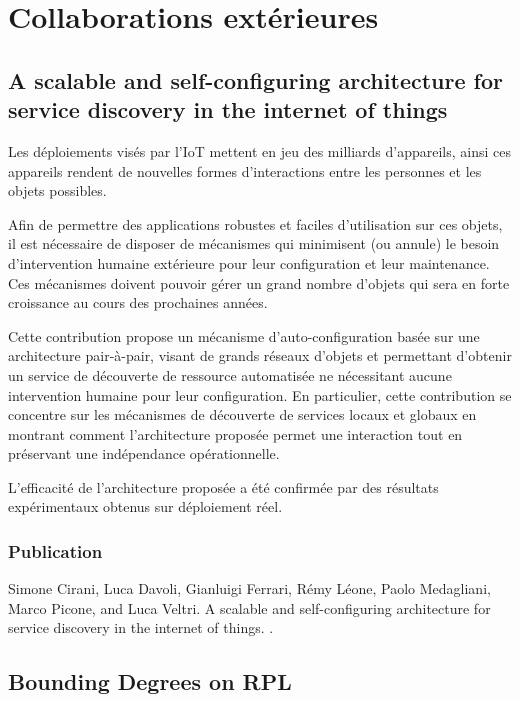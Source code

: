 \chapter{Collaborations extérieures}
\label{collaborations}

\section{A scalable and self-configuring architecture for service discovery in the internet of things}

Les déploiements visés par l'\ac{IoT} mettent en jeu des milliards d'appareils, ainsi ces appareils rendent de nouvelles formes d’interactions entre les personnes et les objets possibles.

Afin de permettre des applications robustes et faciles d'utilisation sur ces objets, il est nécessaire de disposer de mécanismes qui minimisent (ou annule) le besoin d'intervention humaine extérieure pour leur configuration et leur maintenance.
Ces mécanismes doivent pouvoir gérer un grand nombre d'objets qui sera en forte croissance au cours des prochaines années.

Cette contribution propose un mécanisme d'auto-configuration basée sur une architecture pair-à-pair, visant de grands réseaux d'objets et permettant d'obtenir un service de découverte de ressource automatisée ne nécessitant aucune intervention humaine pour leur configuration.
En particulier, cette contribution se concentre sur les mécanismes de découverte de services locaux et globaux en montrant comment l'architecture proposée permet une interaction tout en préservant une indépendance opérationnelle.

L'efficacité de l'architecture proposée a été confirmée par des résultats expérimentaux obtenus sur déploiement réel.

\subsection*{Publication}

Simone Cirani, Luca Davoli, Gianluigi Ferrari, R{\'e}my L{\'e}one, Paolo
  Medagliani, Marco Picone, and Luca Veltri.
\newblock A scalable and self-configuring architecture for service discovery in
  the internet of things.
  .

\section{Bounding Degrees on RPL}

